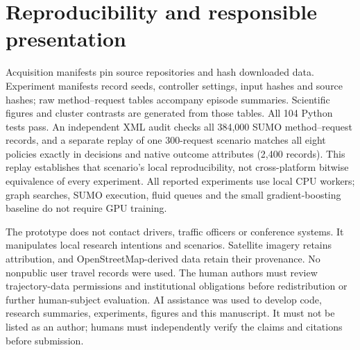 \documentclass[sigconf,anonymous,review]{acmart}
\begin{document}
\section{Reproducibility and responsible presentation}
Acquisition manifests pin source repositories and hash downloaded data. Experiment manifests record seeds, controller settings, input hashes and source hashes; raw method--request tables accompany episode summaries. Scientific figures and cluster contrasts are generated from those tables. All 104 Python tests pass. An independent XML audit checks all 384,000 SUMO method--request records, and a separate replay of one 300-request scenario matches all eight policies exactly in decisions and native outcome attributes (2,400 records). This replay establishes that scenario's local reproducibility, not cross-platform bitwise equivalence of every experiment. All reported experiments use local CPU workers; graph searches, SUMO execution, fluid queues and the small gradient-boosting baseline do not require GPU training.

The prototype does not contact drivers, traffic officers or conference systems. It manipulates local research intentions and scenarios. Satellite imagery retains attribution, and OpenStreetMap-derived data retain their provenance. No nonpublic user travel records were used. The human authors must review trajectory-data permissions and institutional obligations before redistribution or further human-subject evaluation. AI assistance was used to develop code, research summaries, experiments, figures and this manuscript. It must not be listed as an author; humans must independently verify the claims and citations before submission.
\end{document}
